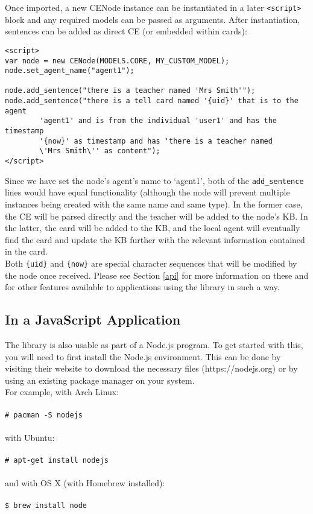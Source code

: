 \documentclass{scrartcl}
\newcommand{\js}[1]{\texttt{#1}}
\begin{document}
Once imported, a new CENode instance can be instantiated in a later \js{<script>} block and any required models can be passed as arguments. After instantiation, sentences can be added as direct CE (or embedded within cards):
\begin{verbatim}
<script>
var node = new CENode(MODELS.CORE, MY_CUSTOM_MODEL);
node.set_agent_name("agent1");

node.add_sentence("there is a teacher named 'Mrs Smith'");
node.add_sentence("there is a tell card named '{uid}' that is to the agent 
        'agent1' and is from the individual 'user1' and has the timestamp 
        '{now}' as timestamp and has 'there is a teacher named 
        \'Mrs Smith\'' as content");
</script>
\end{verbatim}

Since we have set the node's agent's name to `agent1', both of the \js{add\_sentence} lines would have equal functionality (although the node will prevent multiple instances being created with the same name and same type). In the former case, the CE will be parsed directly and the teacher will be added to the node's KB. In the latter, the card will be added to the KB, and the local agent will eventually find the card and update the KB further with the relevant information contained in the card.\\

Both \js{\{uid\}} and \js{\{now\}} are special character sequences that will be modified by the node once received. Please see Section \ref{api} for more information on these and for other features available to applications using the library in such a way.

\subsection{In a JavaScript Application}
\label{as_an_app}
The library is also usable as part of a Node.js program. To get started with this, you will need to first install the Node.js environment. This can be done by visiting their website to download the necessary files (https://nodejs.org) or by using an existing package manager on your system.\\
For example, with Arch Linux:\\
\\\js{\# pacman -S nodejs}\\
\\with Ubuntu:\\
\\\js{\# apt-get install nodejs}\\
\\and with OS X (with Homebrew installed):\\
\\\js{\$ brew install node}\\
\end{document}
